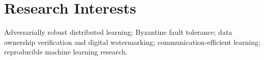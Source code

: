 \section{Research Interests}
Adversarially robust distributed learning; Byzantine fault tolerance;
data ownership verification and digital watermarking; communication-efficient
learning; reproducible machine learning research.
